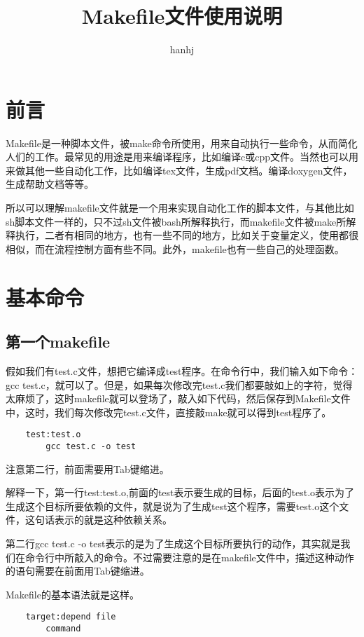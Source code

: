 \documentclass{article}
\begin{document}
\begin{CJK}{UTF8}{gbsn}
\title{Makefile文件使用说明}
\author{hanhj}
\maketitle
	\section*{前言}
	Makefile是一种脚本文件，被make命令所使用，用来自动执行一些命令，从而简化人们的工作。最常见的用途是用来编译程序，比如编译c或cpp文件。当然也可以用来做其他一些自动化工作，比如编译tex文件，生成pdf文档。编译doxygen文件，生成帮助文档等等。
	\par
	所以可以理解makefile文件就是一个用来实现自动化工作的脚本文件，与其他比如sh脚本文件一样的，只不过sh文件被bash所解释执行，而makefile文件被make所解释执行，二者有相同的地方，也有一些不同的地方，比如关于变量定义，使用都很相似，而在流程控制方面有些不同。此外，makefile也有一些自己的处理函数。
	\section{基本命令}
	\subsection {第一个makefile}
	\par
假如我们有test.c文件，想把它编译成test程序。在命令行中，我们输入如下命令：gcc test.c，就可以了。但是，如果每次修改完test.c我们都要敲如上的字符，觉得太麻烦了，这时makefile就可以登场了，敲入如下代码，然后保存到Makefile文件中，这时，我们每次修改完test.c文件，直接敲make就可以得到test程序了。
	\begin{lstlisting}
	test:test.o
		gcc test.c -o test
	\end{lstlisting}
	注意第二行，前面需要用Tab键缩进。
	\par
		解释一下，第一行test:test.o,前面的test表示要生成的目标，后面的test.o表示为了生成这个目标所要依赖的文件，就是说为了生成test这个程序，需要test.o这个文件，这句话表示的就是这种依赖关系。  
	\par
	第二行gcc test.c -o test表示的是为了生成这个目标所要执行的动作，其实就是我们在命令行中所敲入的命令。不过需要注意的是在makefile文件中，描述这种动作的语句需要在前面用Tab键缩进。
	\par 
	Makefile的基本语法就是这样。
	\begin{lstlisting}
	target:depend file
		command
	\end{lstlisting}


\end{CJK}
\end{document}
